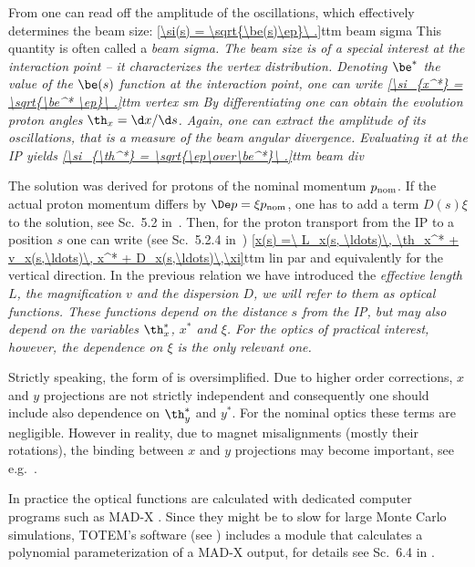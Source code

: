 From  one can read off the amplitude of the oscillations, which effectively determines the beam size:
\eqref{\si(s) = \sqrt{\be(s)\ep}\ .}{ttm beam sigma}
This quantity is often called a \em{beam sigma}. The beam size is of a special interest at the interaction point -- it characterizes the vertex distribution. Denoting $\be^*$ the value of the $\be(s)$ function at the interaction point, one can write
\eqref{\si_{x^*} = \sqrt{\be^* \ep}\ .}{ttm vertex sm}
By differentiating  one can obtain the evolution proton angles $\th_x = \d x/\d s$. Again, one can extract the amplitude of its oscillations, that is a measure of the beam angular divergence. Evaluating it at the IP yields
\eqref{\si_{\th^*} = \sqrt{\ep\over\be^*}\ .}{ttm beam div}

The solution  was derived for protons of the nominal momentum $p_{\rm nom}$. If the actual proton momentum differs by $\De p = \xi p_{\rm nom}$, one has to add a term $D(s) \xi$ to the solution, see Sc.~5.2 in~. Then, for the proton transport from the IP to a position $s$ one can write (see Sc.~5.2.4 in~)
\eqref{x(s) =\ L_x(s, \ldots)\, \th_x^* + v_x(s,\ldots)\, x^* + D_x(s,\ldots)\,\xi}{ttm lin par}
and equivalently for the vertical direction. In the previous relation we have introduced the \em{effective length} $L$, the \em{magnification} $v$ and the \em{dispersion} $D$, we will refer to them as \em{optical functions}. These functions depend on the distance $s$ from the IP, but may also depend on the variables $\th_x^*$, $x^*$ and $\xi$. For the optics of practical interest, however, the dependence on $\xi$ is the only relevant one.

Strictly speaking, the form of  is oversimplified. Due to higher order corrections, $x$ and $y$ projections are not strictly independent and consequently one should include also dependence on $\th_y^*$ and $y^*$. For the nominal optics these terms are negligible. However in reality, due to magnet misalignments (mostly their rotations), the binding between $x$ and $y$ projections may become important, see e.g.~.

In practice the optical functions are calculated with dedicated computer programs such as MAD-X . Since they might be to slow for large Monte Carlo simulations, TOTEM's software (see ) includes a module that calculates a polynomial parameterization of a MAD-X output, for details see Sc.~6.4 in .

